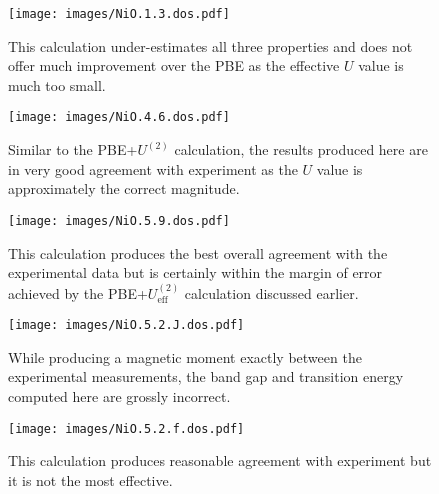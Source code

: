 \begin{figure}[th!]
\centering
\texttt{[image: images/NiO.1.3.dos.pdf]}
\caption[NiO DOS with $U-J=1.3$~eV]
{This calculation under-estimates all three properties 
and does not offer much improvement over the PBE 
as the effective $U$ value is much too small.}
\label{fig:NiO.1.3.dos}
\end{figure}


\begin{figure}[th!]
\centering
\texttt{[image: images/NiO.4.6.dos.pdf]}
\caption[NiO DOS with $U-J=4.6$~eV]
{Similar to the PBE+$U^{(2)}$ calculation, 
the results produced here are in very good  
agreement with experiment as the $U$ value 
is approximately the correct magnitude.}
\label{fig:NiO.4.6.dos}
\end{figure}
\newpage

\begin{figure}[th!]
\centering
\texttt{[image: images/NiO.5.9.dos.pdf]}
\caption[NiO DOS with $U-J=5.9$~eV]
{This calculation produces the best overall agreement 
with the experimental data but is certainly within 
the margin of error achieved by the 
PBE+$U_\textrm{eff}^{(2)}$ calculation discussed earlier.}
\label{fig:NiO.5.9.dos}
\end{figure}


%


\begin{figure}[th!]
\centering
\texttt{[image: images/NiO.5.2.J.dos.pdf]}
\caption[NiO DOS with $U_\textrm{eff}=5.2$ and $J=3.48$~eV]
{While producing a magnetic moment exactly between 
the experimental measurements, 
the band gap and transition energy computed here 
are grossly incorrect.}
\label{fig:NiO.5.2.J.dos}
\end{figure}
\newpage

\begin{figure}[th!]
\centering
\texttt{[image: images/NiO.5.2.f.dos.pdf]}
\caption[NiO DOS with $U_\textrm{eff}=5.2$ and $F_J=0.84$~eV]
{This calculation produces reasonable 
agreement with experiment but it is not the most effective.}
\label{fig:NiO.5.2.f.dos}
\end{figure}


